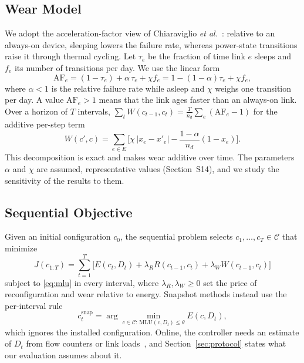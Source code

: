 \documentclass[5p,times]{elsarticle}
\begin{document}
\subsection{Wear Model}

We adopt the acceleration-factor view of Chiaraviglio \emph{et al.}~\cite{chiaraviglio2015lifetime}: relative to an always-on device, sleeping lowers the failure rate, whereas power-state transitions raise it through thermal cycling. Let $\tau_e$ be the fraction of time link $e$ sleeps and $f_e$ its number of transitions per day. We use the linear form
\begin{equation}\label{eq:af}
\mathrm{AF}_e=(1-\tau_e)+\alpha\,\tau_e+\chi f_e=1-(1-\alpha)\tau_e+\chi f_e,
\end{equation}
where $\alpha<1$ is the relative failure rate while asleep and $\chi$ weighs one transition per day. A value $\mathrm{AF}_e>1$ means that the link ages faster than an always-on link. Over a horizon of $T$ intervals, $\sum_{t}W(c_{t-1},c_t)=\frac{T}{n_d}\sum_e(\mathrm{AF}_e-1)$ for the additive per-step term
\begin{equation}\label{eq:wear}
W(c',c)=\sum_{e\in E}\Big[\chi\,|x_e-x'_e|-\frac{1-\alpha}{n_d}(1-x_e)\Big].
\end{equation}
This decomposition is exact and makes wear additive over time. The parameters $\alpha$ and $\chi$ are assumed, representative values (Section~S14), and we study the sensitivity of the results to them.

\subsection{Sequential Objective}

Given an initial configuration $c_0$, the sequential problem selects $c_1,\dots,c_T\in\mathcal{C}$ that minimize
\begin{equation}\label{eq:objective}
J(c_{1:T})=\sum_{t=1}^{T}\Big[E(c_t,D_t)+\lambda_R R(c_{t-1},c_t)+\lambda_W W(c_{t-1},c_t)\Big]
\end{equation}
subject to \eqref{eq:mlu} in every interval, where $\lambda_R,\lambda_W\ge0$ set the price of reconfiguration and wear relative to energy. Snapshot methods instead use the per-interval rule
\begin{equation}\label{eq:snapshot}
c^{\mathrm{snap}}_t=\arg\min_{c\in\mathcal{C}:\,\mathrm{MLU}(c,D_t)\le\theta}E(c,D_t),
\end{equation}
which ignores the installed configuration. Online, the controller needs an estimate of $D_t$ from flow counters or link loads~\cite{zhang2003tomogravity}, and Section~\ref{sec:protocol} states what our evaluation assumes about it.
\end{document}
